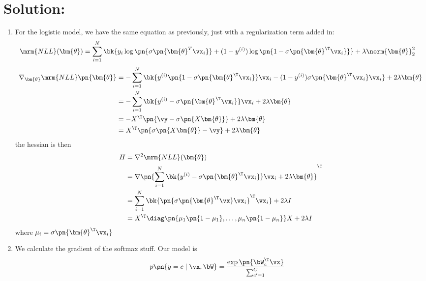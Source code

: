 \documentclass[189]{pset}
\begin{document}
  \hrulefill

  \section*{Solution:}
    \begin{enumerate}
      \item For the logistic model, we have the same equation as
        previously, just with a regularization term added in:
        \begin{align*}
          \mrm{NLL}(\bm{\theta})
          &= \sum_{i=1}^N \bk{y_i \log\pn{\sigma\pn{\bm{\theta}^T
            \vx_i}} + (1-y^{(i)})\log\pn{1- \sigma\pn{\bm{\theta}^\T
            \vx_i}}} + \lambda \norm{\bm{\theta}}_2^2
        \end{align*}
        \begin{align*}
          \nabla_{\bm{\theta}} \mrm{NLL}\pn{\bm{\theta}}
          &= -\sum_{i=1}^N \bk{y^{(i)}\pn{1-\sigma\pn{\bm{\theta}^\T
            \vx_i}}\vx_i - (1-y^{(i)}) \sigma\pn{\bm{\theta}^\T
            \vx_i}\vx_i} + 2\lambda \bm{\theta} \\
          &= -\sum_{i=1}^N \bk{y^{(i)} - \sigma\pn{\bm{\theta}^\T
            \vx_i}} \vx_i + 2 \lambda \bm{\theta} \\
          &= -X^\T \pn{\vy - \sigma \pn{X\bm{\theta}}} + 2\lambda
            \bm{\theta} \\
          &= X^\T \pn{\sigma \pn{X\bm{\theta}} - \vy} + 2\lambda
            \bm{\theta} \\
        \end{align*}
        the hessian is then
        \begin{align*}
          H
          &= \nabla^2 \mrm{NLL}(\bm{\theta}) \\
          &= \nabla \pn{\sum_{i=1}^N \bk{y^{(i)} -
            \sigma\pn{\bm{\theta}^\T \vx_i}}\vx_i +
            2\lambda\bm{\theta}}^\T \\
          &= \sum_{i=1}^N \bk{\pn{\sigma\pn{\bm{\theta}^\T
            \vx}\vx_i}^\T \vx_i} + 2\lambda I\\
          &= X^\T \diag\pn{\mu_1 \pn{1- \mu_1}, \ldots,
            \mu_n\pn{1-\mu_n}} X + 2\lambda I
        \end{align*}
        where $\mu_i = \sigma\pn{\bm{\theta}^\T\vx_i}$
      \item We calculate the gradient of the softmax stuff. Our model
        is
        \begin{align*}
          p\pn{y = c \mid \vx, \bW}
          &= \frac{\exp\pn{\bW_c^\T \vx}}{\sum_{c'=1}^C
}
\end{align*}
\end{enumerate}
\end{document}
